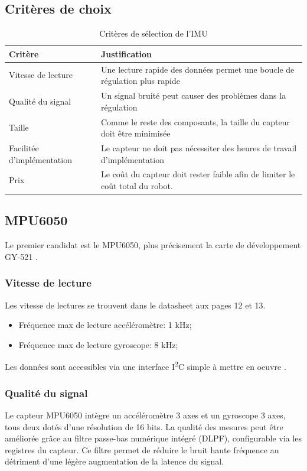 \subsection{Critères de choix}
\begin{table}[H]
    \centering
    \begin{tabular}{|l|p{8cm}|}
        \hline
        \textbf{Critère} & \textbf{Justification} \\
        \hline
        Vitesse de lecture & Une lecture rapide des données permet une boucle de régulation plus rapide \\
        \hline
        Qualité du signal & Un signal bruité peut causer des problèmes dans la régulation \\
        \hline
        Taille & Comme le reste des composants, la taille du capteur doit être minimisée \\
        \hline
        Facilitée d'implémentation & Le capteur ne doit pas nécessiter des heures de travail d'implémentation\\
        \hline
        Prix & Le coût du capteur doit rester faible afin de limiter le coût total du robot. \\
        \hline
    \end{tabular}
    \caption{Critères de sélection de l'IMU}
    \label{tab:criteres_IMU}
\end{table}
\subsection{MPU6050}
Le premier candidat est le MPU6050, plus précisement la carte de développement GY-521 \cite{GY521_Datasheet}.
\subsubsection{Vitesse de lecture}
Les vitesse de lectures se trouvent dans le datasheet aux pages 12 et 13.
\begin{itemize}
    \item Fréquence max de lecture accéléromètre: 1 kHz;
    \item Fréquence max de lecture gyroscope:  8 kHz;
\end{itemize}
Les données sont accessibles via une interface I\textsuperscript{2}C simple à mettre en oeuvre \cite{MPU6050_Datasheet}.
\subsubsection{Qualité du signal}
Le capteur MPU6050 intègre un accéléromètre 3 axes et un gyroscope 3 axes, tous deux dotés d'une résolution de 16 bits. 
La qualité des mesures peut être améliorée grâce au filtre passe-bas numérique intégré (DLPF), configurable via les registres du capteur. 
Ce filtre permet de réduire le bruit haute fréquence au détriment d'une légère augmentation de la latence du signal. 

